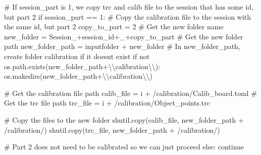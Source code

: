 \documentclass[
  letterpaper,
  DIV=11,
  numbers=noendperiod]{scrreprt}
\newenvironment{Shaded}{\begin{snugshade}}{\end{snugshade}}
\newcommand{\CharTok}[1]{\textcolor[rgb]{0.13,0.47,0.30}{#1}}
\newcommand{\CommentTok}[1]{\textcolor[rgb]{0.37,0.37,0.37}{#1}}
\newcommand{\ControlFlowTok}[1]{\textcolor[rgb]{0.00,0.23,0.31}{#1}}
\newcommand{\KeywordTok}[1]{\textcolor[rgb]{0.00,0.23,0.31}{#1}}
\newcommand{\NormalTok}[1]{\textcolor[rgb]{0.00,0.23,0.31}{#1}}
\newcommand{\OperatorTok}[1]{\textcolor[rgb]{0.37,0.37,0.37}{#1}}
\newcommand{\StringTok}[1]{\textcolor[rgb]{0.13,0.47,0.30}{#1}}
\begin{document}
\begin{Shaded}
\begin{Highlighting}[]
        \CommentTok{\# If session\_part is 1, we copy trc and calib file to the session that has some id, but part 2}
        \ControlFlowTok{if}\NormalTok{ session\_part }\OperatorTok{==} \StringTok{\textquotesingle{}1\textquotesingle{}}\NormalTok{:}
            \CommentTok{\# Copy the calibration file to the session with the same id, but part 2}
\NormalTok{            copy\_to\_part }\OperatorTok{=} \StringTok{\textquotesingle{}2\textquotesingle{}}
            \CommentTok{\# Get the new folder name}
\NormalTok{            new\_folder }\OperatorTok{=} \StringTok{\textquotesingle{}Session\_\textquotesingle{}}\OperatorTok{+}\NormalTok{session\_id}\OperatorTok{+}\StringTok{\textquotesingle{}\_\textquotesingle{}}\OperatorTok{+}\NormalTok{copy\_to\_part}
            \CommentTok{\# Get the new folder path}
\NormalTok{            new\_folder\_path }\OperatorTok{=}\NormalTok{ inputfolder }\OperatorTok{+}\NormalTok{ new\_folder}
            \CommentTok{\# In new\_folder\_path, create folder calibration if it doesn\textquotesingle{}t exist}
            \ControlFlowTok{if} \KeywordTok{not}\NormalTok{ os.path.exists(new\_folder\_path}\OperatorTok{+}\StringTok{\textquotesingle{}}\CharTok{\textbackslash{}\textbackslash{}}\StringTok{calibration}\CharTok{\textbackslash{}\textbackslash{}}\StringTok{\textquotesingle{}}\NormalTok{):}
\NormalTok{                os.makedirs(new\_folder\_path}\OperatorTok{+}\StringTok{\textquotesingle{}}\CharTok{\textbackslash{}\textbackslash{}}\StringTok{calibration}\CharTok{\textbackslash{}\textbackslash{}}\StringTok{\textquotesingle{}}\NormalTok{)}
            
            \CommentTok{\# Get the calibration file path}
\NormalTok{            calib\_file }\OperatorTok{=}\NormalTok{ i }\OperatorTok{+} \StringTok{\textquotesingle{}/calibration/Calib\_board.toml\textquotesingle{}}
            \CommentTok{\# Get the trc file path}
\NormalTok{            trc\_file }\OperatorTok{=}\NormalTok{ i }\OperatorTok{+} \StringTok{\textquotesingle{}/calibration/Object\_points.trc\textquotesingle{}}
            
            \CommentTok{\# Copy the files to the new folder}
\NormalTok{            shutil.copy(calib\_file, new\_folder\_path }\OperatorTok{+} \StringTok{\textquotesingle{}/calibration/\textquotesingle{}}\NormalTok{)}
\NormalTok{            shutil.copy(trc\_file, new\_folder\_path }\OperatorTok{+} \StringTok{\textquotesingle{}/calibration/\textquotesingle{}}\NormalTok{)}
        
        \CommentTok{\# Part 2 does not need to be calibrated so we can just proceed}
        \ControlFlowTok{else}\NormalTok{:}
            \ControlFlowTok{continue}


\end{Highlighting}
\end{Shaded}
\end{document}
